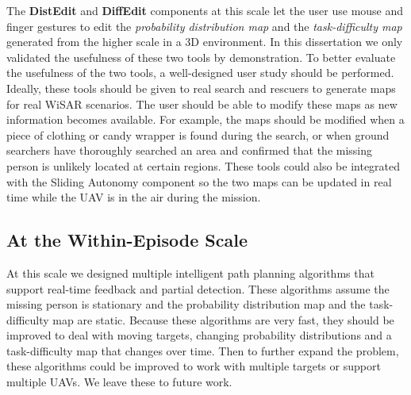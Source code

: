The \textbf{DistEdit} and \textbf{DiffEdit} components at this scale let the user use mouse and finger gestures to edit the \textit{probability distribution map} and the \textit{task-difficulty map} generated from the higher scale in a 3D environment. In this dissertation we only validated the usefulness of these two tools by demonstration. To better evaluate the usefulness of the two tools, a well-designed user study should be performed. Ideally, these tools should be given to real search and rescuers to generate maps for real WiSAR scenarios. The user should be able to modify these maps as new information becomes available. For example, the maps should be modified when a piece of clothing or candy wrapper is found during the search, or when ground searchers have thoroughly searched an area and confirmed that the missing person is unlikely located at certain regions. These tools could also be integrated with the Sliding Autonomy component so the two maps can be updated in real time while the UAV is in the air during the mission.

\subsection{At the Within-Episode Scale}

At this scale we designed multiple intelligent path planning algorithms that support real-time feedback and partial detection. These algorithms assume the missing person is stationary and the probability distribution map and the task-difficulty map are static. Because these algorithms are very fast, they should be improved to deal with moving targets, changing probability distributions and a task-difficulty map that changes over time. Then to further expand the problem, these algorithms could be improved to work with multiple targets or support multiple UAVs. We leave these to future work.

